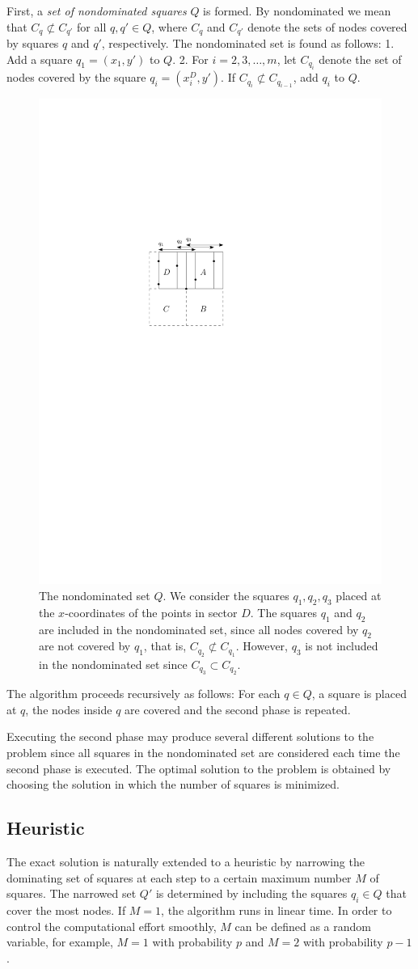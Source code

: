 \documentclass{article}
\begin{document}
First, a \emph{set of nondominated squares} $Q$ is formed. By nondominated we mean 
that $C_q \not \subset C_{q'}$ for all $q,q' \in Q$, where $C_q$ and $C_{q'}$ denote
the sets of nodes covered by squares $q$ and $q'$, respectively. The nondominated 
set is found as follows: 1. Add a square $q_1 = (x_1,y')$ to $Q$. 2. For $i = 2,3,\ldots,m$,
let $C_{q_i}$ denote the set of nodes covered by the square $q_i = (x_i^D,y')$. If $C_{q_i} \not \subset C_{q_{i-1}}$,
add $q_{i}$ to $Q$.

\begin{figure}[ht]
\begin{center}
\includegraphics[width=0.4\columnwidth]{nondominated01}
\caption{The nondominated set $Q$. We consider the squares $q_1,q_2,q_3$ placed at
the $x$-coordinates of the points in sector $D$. The squares $q_1$ and $q_2$ are included in 
the nondominated set, since all nodes covered by $q_2$ are not covered by $q_1$, that is, $C_{q_2} \not \subset C_{q_1}$.
However, $q_3$ is not included in the nondominated set since $C_{q_3} \subset C_{q_2}$.
}
\label{nondominated01}
\end{center}
\end{figure}

The algorithm proceeds recursively as follows: For each $q \in Q$, a square is placed at $q$, 
the nodes inside $q$ are covered and the second phase is repeated.

Executing the second phase may produce several different solutions to the problem since all
squares in the nondominated set are considered each time the second phase is executed.
The optimal solution to the problem is obtained by choosing the solution in which the 
number of squares is minimized.


\subsection{Heuristic}
The exact solution is naturally extended to a heuristic by narrowing
the dominating set of squares at each step to a certain maximum number $M$
of squares. The narrowed set $Q'$ is determined by including the squares 
$q_i \in Q$ that cover the most nodes. If $M=1$, the algorithm runs in linear time.
In order to control the computational effort smoothly, $M$ can be defined
as a random variable, for example, $M=1$ with probability $p$ and $M=2$ with probability $p-1$.
\end{document}
